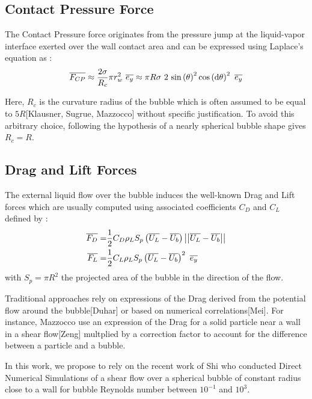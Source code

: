 \subsection{Contact Pressure Force}\label{subsec:FCP}

The Contact Pressure force originates from the pressure jump at the liquid-vapor interface exerted over the wall contact area and can be expressed using Laplace's equation as :
\begin{align}
\vect{F_{CP}}  \approx \frac{2\sigma}{R_{c}} \pi r_{w}^{2}\  \vect{e_{y}}
\approx \pi R \sigma\ 2\ \sin{\theta}^{2} \cos{\dtheta}^{2}\ \vect{e_{y}}
\label{eq:FCP}
\end{align}

Here, $R_{c}$ is the curvature radius of the bubble which is often assumed to be equal to $5R$[Klausner, Sugrue, Mazzocco] without specific justification. To avoid this arbitrary choice, following the hypothesis of a nearly spherical bubble shape gives $R_{c}=R$.

\subsection{Drag and Lift Forces}\label{subsec:FD}

The external liquid flow over the bubble induces the well-known Drag and Lift forces which are usually computed using associated coefficients $C_{D}$ and $C_{L}$ defined by :
\begin{align}
\vect{F_{D}}=&\frac{1}{2}C_{D}\rho_{L}S_{p}\parth{\vect{U_{L}}-\vect{U_{b}}} \norm{ \vect{U_{L}}-\vect{U_{b}} }\\
\vect{F_{L}}=&\frac{1}{2}C_{L}\rho_{L}S_{p}\parth{\vect{U_{L}}-\vect{U_{b}}}^{2}\ \vect{e_{y}}
\end{align}
with $S_{p}=\pi R^{2}$ the projected area of the bubble in the direction of the flow.


Traditional approaches rely on expressions of the Drag derived from the potential flow around the bubble[Duhar] or based on numerical correlations[Mei]. For instance, Mazzocco \etal [Mazzocco] use an expression of the Drag for a solid particle near a wall in a shear flow[Zeng] multplied by a correction factor to account for the difference between a particle and a bubble.

In this work, we propose to rely on the recent work of Shi \etal [Shi] who conducted Direct Numerical Simulations of a shear flow over a spherical bubble of constant radius close to a wall for bubble Reynolds number between $10^{-1}$ and $10^{3}$.

